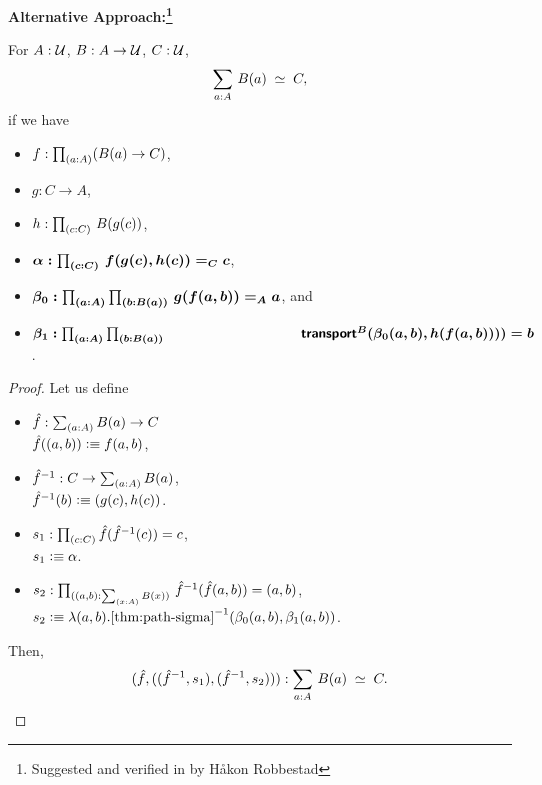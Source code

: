 \documentclass[centering]{report}
\newenvironment{slide}
    {\newpage
    \vspace*{\fill}
    }
    {
     \vspace*{\fill}
    }
\begin{document}
\begin{slide}
\textbf{Alternative Approach:\footnote{\LARGE Suggested and verified in \Agda by Håkon Robbestad}}\\

\begin{lem} For $A:\mathcal{U}$, $B: A\to\mathcal{U}$, $C : \mathcal{U}$,
\begin{align*}
    \eqvspaced{\sm{a : A} B(a)}{C},
\end{align*}
if we have
\begin{itemize}
\item $f : \prd{a:A}(B(a)\rightarrow C)$,
\item $g : C\rightarrow A$,
\item $h : \prd{c:C}\,B(g(c))$,
\item $\boldsymbol{\alpha:\prd{c:C}\,f(g(c),h(c)) =_C c}$,
\item $\boldsymbol{\beta_0:\prd{a:A}{b:B(a)}\,g(f(a,b))=_A a}$, and
\item $\boldsymbol{\beta_1:\prd{a:A}{b:B(a)}}\\
\hspace*{35mm}\boldsymbol{\transfib{B}{\beta_{0}(a,b)}{h(f(a,b)))} = b}$.
\end{itemize}
\vspace*{\fill}
\end{lem}
\end{slide}

\begin{slide}
\begin{proof}
Let us define
\begin{itemize}
    \item $\hat{f} : \sm{a : A} B(a) \to C$ \\ $\hat{f}((a, b)) \vcentcolon\equiv f(a,b)$,
    \item $\opp{\hat{f}} : C \to \sm{a : A} B(a)$, \\
    $\mathord{{\hat{f}}^{-1}}(b)\vcentcolon\equiv (g(c), h(c))$.
\end{itemize}
\begin{itemize}
    \item $s_1 : \prd{c : C} \hat{f}(\opp{\hat{f}}(c)) = c$,\\
    $s_1 \vcentcolon\equiv \alpha$.
    \item $s_2 : \prd{(a,b) : \sm{x:A} B(x)}\, \opp{\hat{f}}(\hat{f}(a,b)) = (a,b)$,\\
    $s_2 \defeq \lambda (a,b).\opp{\text{\cref{thm:path-sigma}}}(\beta_0(a,b), \beta_1(a,b))$.
\end{itemize}
Then,
\begin{align*}
(\hat{f}, ((\opp{\hat{f}},s_1),(\opp{\hat{f}},s_2))) : \eqvspaced{\sm{a : A} B(a)}{C}.
\end{align*}
\end{proof}
\end{slide}
\end{document}
